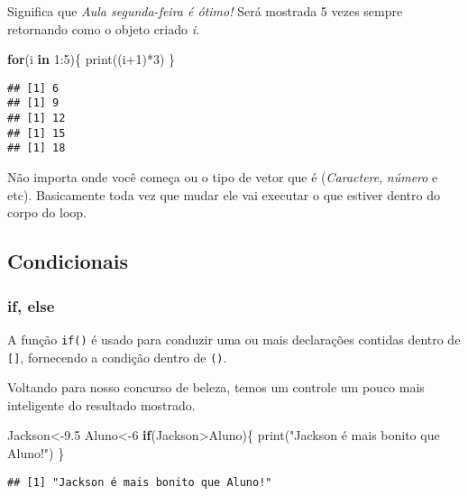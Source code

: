 \documentclass[
]{book}
\newenvironment{Shaded}{\begin{snugshade}}{\end{snugshade}}
\newcommand{\ControlFlowTok}[1]{\textcolor[rgb]{0.13,0.29,0.53}{\textbf{#1}}}
\newcommand{\DecValTok}[1]{\textcolor[rgb]{0.00,0.00,0.81}{#1}}
\newcommand{\FloatTok}[1]{\textcolor[rgb]{0.00,0.00,0.81}{#1}}
\newcommand{\FunctionTok}[1]{\textcolor[rgb]{0.00,0.00,0.00}{#1}}
\newcommand{\NormalTok}[1]{#1}
\newcommand{\OtherTok}[1]{\textcolor[rgb]{0.56,0.35,0.01}{#1}}
\newcommand{\SpecialCharTok}[1]{\textcolor[rgb]{0.00,0.00,0.00}{#1}}
\newcommand{\StringTok}[1]{\textcolor[rgb]{0.31,0.60,0.02}{#1}}
\begin{document}
Significa que \emph{Aula segunda-feira é ótimo!} Será mostrada 5 vezes sempre retornando como o objeto criado \emph{i}.

\begin{Shaded}
\begin{Highlighting}[]
\ControlFlowTok{for}\NormalTok{(i }\ControlFlowTok{in}  \DecValTok{1}\SpecialCharTok{:}\DecValTok{5}\NormalTok{)\{}
  \FunctionTok{print}\NormalTok{((i}\SpecialCharTok{+}\DecValTok{1}\NormalTok{)}\SpecialCharTok{*}\DecValTok{3}\NormalTok{)}
\NormalTok{  \}}
\end{Highlighting}
\end{Shaded}

\begin{verbatim}
## [1] 6
## [1] 9
## [1] 12
## [1] 15
## [1] 18
\end{verbatim}

Não importa onde você começa ou o tipo de vetor que é (\emph{Caractere}, \emph{número} e etc). Basicamente toda vez que mudar ele vai executar o que estiver dentro do corpo do loop.

\hypertarget{condicionais}{%
\subsection{Condicionais}\label{condicionais}}

\hypertarget{if-else}{%
\subsubsection{if, else}\label{if-else}}

A função \texttt{if()} é usado para conduzir uma ou mais declarações contidas dentro de \texttt{{[}{]}}, fornecendo a condição dentro de \texttt{()}.

Voltando para nosso concurso de beleza, temos um controle um pouco mais inteligente do resultado mostrado.

\begin{Shaded}
\begin{Highlighting}[]
\NormalTok{Jackson}\OtherTok{\textless{}{-}}\FloatTok{9.5}  
\NormalTok{Aluno}\OtherTok{\textless{}{-}}\DecValTok{6} 
\ControlFlowTok{if}\NormalTok{(Jackson}\SpecialCharTok{\textgreater{}}\NormalTok{Aluno)\{  }
  \FunctionTok{print}\NormalTok{(}\StringTok{"Jackson é mais bonito que Aluno!"}\NormalTok{)}
\NormalTok{  \}}
\end{Highlighting}
\end{Shaded}

\begin{verbatim}
## [1] "Jackson é mais bonito que Aluno!"
\end{verbatim}
\end{document}
